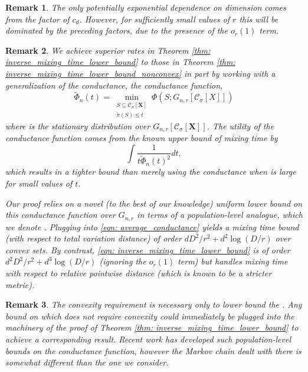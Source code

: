 \documentclass{article}
\newcommand{\1}{\mathbf{1}}
\newcommand{\Xbf}{\mathbf{X}}
\newcommand{\Pbb}{\mathbb{P}}
\newcommand{\Cset}{\mathcal{C}}
\newcommand{\Csig}{\Cset_{\sigma}}
\theoremstyle{aldenthm}
\theoremstyle{aldenrmrk}
\newtheorem{remark}{Remark}
\begin{document}
\begin{remark}
The only potentially exponential dependence on dimension comes from the
factor of $c_d$. However, for sufficiently small values of $r$ this will
be dominated by the preceding factors, due to the presence of the
$o_r(1)$ term. 
\end{remark}
 
\begin{remark}
We achieve superior rates in Theorem \ref{thm: inverse_mixing_time_lower_bound}
to those in Theorem \ref{thm: inverse_mixing_time_lower_bound_nonconvex} in part
by working with a generalization of the conductance, the \emph{conductance
  function},
\begin{equation*}
\widetilde{\Phi}_n(t) = 
\min_{\substack{S \subseteq \Csig[\Xbf] \\ \tilde\pi(S) \leq t}} \Phi(S; G_{n,r}[\Csig[X]]) 
\end{equation*}
where \smash{$\tilde\pi$} is the stationary distribution over
$G_{n,r}[\Csig[\Xbf]]$. The utility of the conductance function comes from the
known upper bound of mixing time by  
\begin{equation}
\label{eqn: average_conductance}
\int \frac{1}{t \widetilde{\Phi}_n(t)^2} dt,
\end{equation}
which results in a tighter bound than merely using the conductance when
 is large for small values of $t$. 
 
Our proof relies on a novel (to the best of our knowledge) uniform lower bound
on this conductance function over $G_{n,r}$ in terms of a population-level
analogue, which we denote \smash{$\widetilde{\Phi}_{\Pbb,r}$}. Plugging
\smash{$\widetilde{\Phi}_{\Pbb,r}$} into \eqref{eqn: average_conductance} yields
a mixing time bound (with respect to total variation distance) of order $d
D^2/r^2 + d^2\log(D/r)$ over convex sets. By contrast, \eqref{eqn:
  inverse_mixing_time_lower_bound} is of order $d^2 D^2/r^2 + d^3\log(D/r)$ 
(ignoring the $o_r(1)$ term) but handles mixing time with respect to relative
pointwise distance (which is known to be a stricter metric). 
\end{remark}

\begin{remark}
  The convexity requirement is necessary only to lower bound the
  \smash{$\widetilde{\Phi}_{\Pbb,r}$}. Any bound on
  \smash{$\widetilde{\Phi}_{\Pbb,r}$} which does not require convexity could
  immediately be plugged into the machinery of the proof of Theorem \ref{thm:
    inverse_mixing_time_lower_bound} to achieve a corresponding result. Recent
  work \citep{abbasi17} has developed such population-level bounds on the
  conductance function, however the Markov chain dealt with there is somewhat
  different than the one we consider.   
\end{remark}
\end{document}
